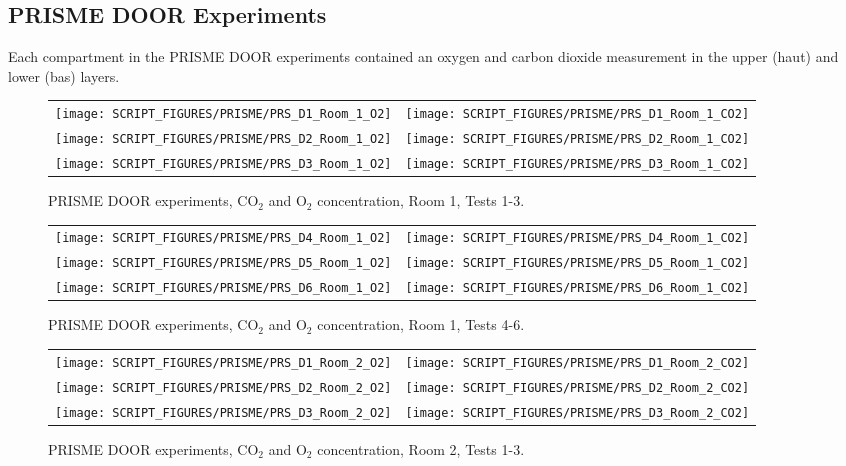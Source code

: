 \clearpage

\subsection{PRISME DOOR Experiments}

Each compartment in the PRISME DOOR experiments contained an oxygen and carbon dioxide measurement in the upper (haut) and lower (bas) layers.

\begin{figure}[!ht]
\begin{tabular*}{\textwidth}{l@{\extracolsep{\fill}}r}
\texttt{[image: SCRIPT\_FIGURES/PRISME/PRS\_D1\_Room\_1\_O2]} &
\texttt{[image: SCRIPT\_FIGURES/PRISME/PRS\_D1\_Room\_1\_CO2]} \\
\texttt{[image: SCRIPT\_FIGURES/PRISME/PRS\_D2\_Room\_1\_O2]} &
\texttt{[image: SCRIPT\_FIGURES/PRISME/PRS\_D2\_Room\_1\_CO2]} \\
\texttt{[image: SCRIPT\_FIGURES/PRISME/PRS\_D3\_Room\_1\_O2]} &
\texttt{[image: SCRIPT\_FIGURES/PRISME/PRS\_D3\_Room\_1\_CO2]}
\end{tabular*}
\caption{PRISME DOOR experiments, CO$_2$ and O$_2$ concentration, Room 1, Tests 1-3.}
\label{PRISME_Gas_1}
\end{figure}

\begin{figure}[p]
\begin{tabular*}{\textwidth}{l@{\extracolsep{\fill}}r}
\texttt{[image: SCRIPT\_FIGURES/PRISME/PRS\_D4\_Room\_1\_O2]} &
\texttt{[image: SCRIPT\_FIGURES/PRISME/PRS\_D4\_Room\_1\_CO2]} \\
\texttt{[image: SCRIPT\_FIGURES/PRISME/PRS\_D5\_Room\_1\_O2]} &
\texttt{[image: SCRIPT\_FIGURES/PRISME/PRS\_D5\_Room\_1\_CO2]} \\
\texttt{[image: SCRIPT\_FIGURES/PRISME/PRS\_D6\_Room\_1\_O2]} &
\texttt{[image: SCRIPT\_FIGURES/PRISME/PRS\_D6\_Room\_1\_CO2]}
\end{tabular*}
\caption{PRISME DOOR experiments, CO$_2$ and O$_2$ concentration, Room 1, Tests 4-6.}
\label{PRISME_Gas_2}
\end{figure}

\begin{figure}[p]
\begin{tabular*}{\textwidth}{l@{\extracolsep{\fill}}r}
\texttt{[image: SCRIPT\_FIGURES/PRISME/PRS\_D1\_Room\_2\_O2]} &
\texttt{[image: SCRIPT\_FIGURES/PRISME/PRS\_D1\_Room\_2\_CO2]} \\
\texttt{[image: SCRIPT\_FIGURES/PRISME/PRS\_D2\_Room\_2\_O2]} &
\texttt{[image: SCRIPT\_FIGURES/PRISME/PRS\_D2\_Room\_2\_CO2]} \\
\texttt{[image: SCRIPT\_FIGURES/PRISME/PRS\_D3\_Room\_2\_O2]} &
\texttt{[image: SCRIPT\_FIGURES/PRISME/PRS\_D3\_Room\_2\_CO2]}
\end{tabular*}
\caption{PRISME DOOR experiments, CO$_2$ and O$_2$ concentration, Room 2, Tests 1-3.}
\label{PRISME_Gas_3}
\end{figure}

